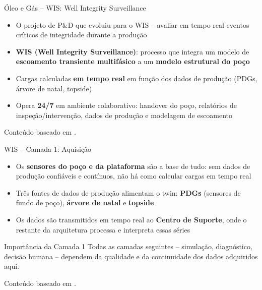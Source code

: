 \documentclass[aspectratio=169,xcolor=dvipsnames]{beamer}
\begin{document}
\begin{frame}{Óleo e Gás -- WIS: Well Integrity Surveillance}
    \footnotesize
    \begin{itemize}
    \item O projeto de P\&D que evoluiu para o WIS -- avaliar em tempo real eventos críticos de integridade durante a produção
        \item \textbf{WIS (Well Integrity Surveillance)}: processo que integra um modelo de \textbf{escoamento transiente multifásico}  a um \textbf{modelo estrutural do poço} 
        \item Cargas calculadas \textbf{em tempo real} em função dos dados de produção (PDGs, árvore de natal, topside)
        \item Opera \textbf{24/7} em ambiente colaborativo: handover do poço, relatórios de inspeção/intervenção, dados de produção e modelagem de escoamento
    \end{itemize}
    
    \vfill
    \footnotesize Conteúdo baseado em \cite{spe210260,otc2020}.
\end{frame}

\begin{frame}{WIS -- Camada 1: Aquisição}
    \begin{itemize}\setlength\itemsep{6pt}
        \item Os \textbf{sensores do poço e da plataforma} são a base de tudo: sem dados de produção confiáveis e contínuos, não há como calcular cargas em tempo real
        \item Três fontes de dados de produção alimentam o twin: \textbf{PDGs} (sensores de fundo de poço), \textbf{árvore de natal} e \textbf{topside}
        \item Os dados são transmitidos em tempo real ao \textbf{Centro de Suporte}, onde o restante da arquitetura processa e interpreta essas séries
    \end{itemize}
    \begin{exampleblock}{Importância da Camada 1}
        Todas as camadas seguintes -- simulação, diagnóstico, decisão humana -- dependem da qualidade e da continuidade dos dados adquiridos aqui.
    \end{exampleblock}
    \vfill
    \footnotesize Conteúdo baseado em \cite{otc2020}.
\end{frame}
\end{document}
